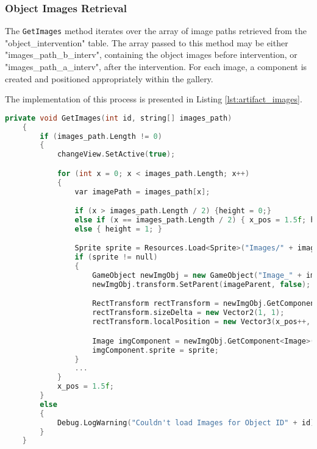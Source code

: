 \subsubsection{Object Images Retrieval}

The \texttt{GetImages} method iterates over the array of image paths retrieved from the "object\_intervention" table. The array passed to this method may be either "images\_path\_b\_interv", containing the object images before intervention, or "images\_path\_a\_interv", after the intervention.
For each image, a component is created and positioned appropriately within the gallery.

The implementation of this process is presented in Listing \ref{lst:artifact_images}.

\begin{lstlisting}[language=C++, caption={Method used to load artifact images and to display them in the Images Gallery.}, label={lst:artifact_images}]
      private void GetImages(int id, string[] images_path)
    {
        if (images_path.Length != 0)
        {
            changeView.SetActive(true);

            for (int x = 0; x < images_path.Length; x++)
            {
                var imagePath = images_path[x];

                if (x > images_path.Length / 2) {height = 0;}
                else if (x == images_path.Length / 2) { x_pos = 1.5f; height = 0; }
                else { height = 1; }

                Sprite sprite = Resources.Load<Sprite>("Images/" + imagePath);
                if (sprite != null)
                {
                    GameObject newImgObj = new GameObject("Image_" + imagePath, typeof(RectTransform), typeof(CanvasRenderer), typeof(Image));
                    newImgObj.transform.SetParent(imageParent, false);

                    RectTransform rectTransform = newImgObj.GetComponent<RectTransform>();
                    rectTransform.sizeDelta = new Vector2(1, 1);
                    rectTransform.localPosition = new Vector3(x_pos++, height, 0);

                    Image imgComponent = newImgObj.GetComponent<Image>();
                    imgComponent.sprite = sprite;
                }
                ...
            }
            x_pos = 1.5f;
        }
        else
        {
            Debug.LogWarning("Couldn't load Images for Object ID" + id);
        }
    }
\end{lstlisting}


